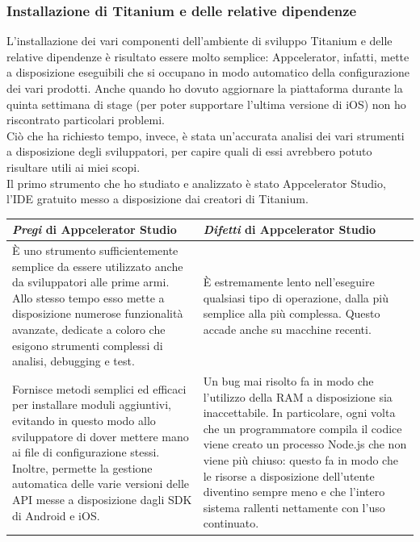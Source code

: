 			\subsubsection{Installazione di Titanium e delle relative dipendenze}
				L'installazione dei vari componenti dell'ambiente di sviluppo Titanium e delle relative dipendenze è risultato
				essere molto semplice: Appcelerator, infatti, mette a disposizione eseguibili che si occupano in modo automatico
				della configurazione dei vari prodotti. Anche quando ho dovuto aggiornare la piattaforma durante la quinta settimana
				di stage (per poter supportare l'ultima versione di iOS) non ho riscontrato particolari problemi.\\
				Ciò che ha richiesto tempo, invece, è stata un'accurata analisi dei vari strumenti a disposizione degli sviluppatori,
				per capire quali di essi avrebbero potuto risultare utili ai miei scopi.\\
				Il primo strumento che ho studiato e analizzato è stato Appcelerator Studio, l'IDE gratuito messo a disposizione dai
				creatori di Titanium.
				\begin{center}
					\begin{tabular}[H]{| p{0.43\textwidth} | p{} |}
						\hline
						\emph{Pregi} di Appcelerator Studio &
						\emph{Difetti} di Appcelerator Studio\\
						\hline\hline
						È uno strumento sufficientemente semplice da essere utilizzato anche da sviluppatori alle prime armi.
						Allo stesso tempo esso mette a disposizione numerose funzionalità avanzate, dedicate a coloro che
						esigono strumenti complessi di analisi, debugging e test. &
						È estremamente lento nell'eseguire qualsiasi tipo di operazione, dalla più semplice alla più
						complessa. Questo accade anche su macchine recenti.\\
						\hline
						Fornisce metodi semplici ed efficaci per installare moduli aggiuntivi, evitando in questo modo allo
						sviluppatore di dover mettere mano ai file di configurazione stessi. Inoltre, permette la gestione
						automatica delle varie versioni delle API messe a disposizione dagli SDK di Android e iOS. &
						Un bug mai risolto fa in modo che l'utilizzo della RAM a disposizione sia inaccettabile. In
						particolare, ogni volta che un programmatore compila il codice viene creato un processo Node.js che
						non viene più chiuso: questo fa in modo che le risorse a disposizione dell'utente diventino sempre
						meno e che l'intero sistema rallenti nettamente con l'uso continuato.\\
						\hline
					\end{tabular}
				\end{center}
